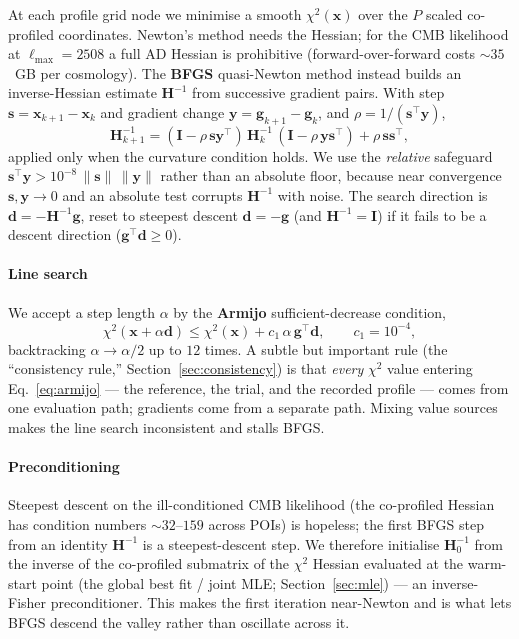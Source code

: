 \documentclass[11pt]{article}
\newcommand{\chisq}{\chi^2}
\newcommand{\Lmax}{\ell_{\max}}
\begin{document}
At each profile grid node we minimise a smooth $\chisq(\bm x)$ over the
$P$ scaled co-profiled coordinates. Newton's method needs the Hessian;
for the CMB likelihood at $\Lmax=2508$ a full AD Hessian is prohibitive
(forward-over-forward costs $\sim35$~GB per cosmology). The
\textbf{BFGS} quasi-Newton method instead builds an inverse-Hessian
estimate $\bm H^{-1}$ from successive gradient pairs. With step
$\bm s=\bm x_{k+1}-\bm x_k$ and gradient change $\bm y=\bm
g_{k+1}-\bm g_k$, and $\rho=1/(\bm s^\top\bm y)$,
\begin{equation}
\bm H^{-1}_{k+1}=
(\bm I-\rho\,\bm s\bm y^\top)\,\bm H^{-1}_k\,(\bm I-\rho\,\bm y\bm
s^\top)+\rho\,\bm s\bm s^\top,
\label{eq:bfgs}
\end{equation}
applied only when the curvature condition holds. We use the
\emph{relative} safeguard $\bm s^\top\bm y>10^{-8}\,\lVert\bm
s\rVert\,\lVert\bm y\rVert$ rather than an absolute floor, because near
convergence $\bm s,\bm y\to0$ and an absolute test corrupts $\bm H^{-1}$
with noise. The search direction is $\bm d=-\bm H^{-1}\bm g$, reset to
steepest descent $\bm d=-\bm g$ (and $\bm H^{-1}=\bm I$) if it fails to be
a descent direction ($\bm g^\top\bm d\ge0$).

\paragraph{Line search}
We accept a step length $\alpha$ by the \textbf{Armijo} sufficient-decrease
condition,
\begin{equation}
\chisq(\bm x+\alpha\bm d)\le\chisq(\bm x)+c_1\,\alpha\,\bm g^\top\bm d,
\qquad c_1=10^{-4},
\label{eq:armijo}
\end{equation}
backtracking $\alpha\to\alpha/2$ up to $12$ times. A subtle but important
rule (the ``consistency rule,'' Section~\ref{sec:consistency}) is that
\emph{every} $\chisq$ value entering Eq.~\eqref{eq:armijo} --- the
reference, the trial, and the recorded profile --- comes from one
evaluation path; gradients come from a separate path. Mixing value
sources makes the line search inconsistent and stalls BFGS.

\paragraph{Preconditioning}
Steepest descent on the ill-conditioned CMB likelihood (the co-profiled
Hessian has condition numbers $\sim32$--$159$ across POIs) is hopeless;
the first BFGS step from an identity $\bm H^{-1}$ is a steepest-descent
step. We therefore initialise $\bm H^{-1}_0$ from the inverse of the
co-profiled submatrix of the $\chisq$ Hessian evaluated at the warm-start
point (the global best fit / joint MLE; Section~\ref{sec:mle}) --- an
inverse-Fisher preconditioner. This makes the first iteration near-Newton
and is what lets BFGS descend the valley rather than oscillate across it.
\end{document}
